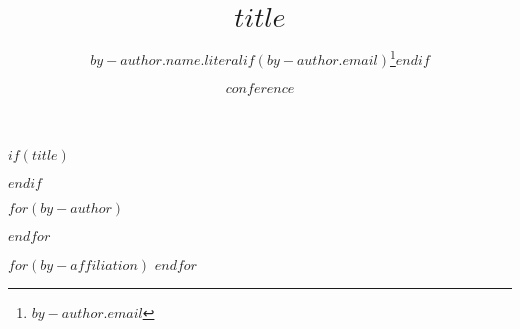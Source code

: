 
$if(title)$
\title{$title$}
$endif$

$for(by-author)$
\author[$for(by-author.affiliations/allbutlast)$$it.number$,$endfor$$for(by-author.affiliations/last)$$it.number$$endfor$]{$by-author.name.literal$$if(by-author.email)$\thanks{$by-author.email$}$endif$}
$endfor$

$for(by-affiliation)$
$endfor$

\date{$conference$}

\renewcommand\Authands{ and } %
